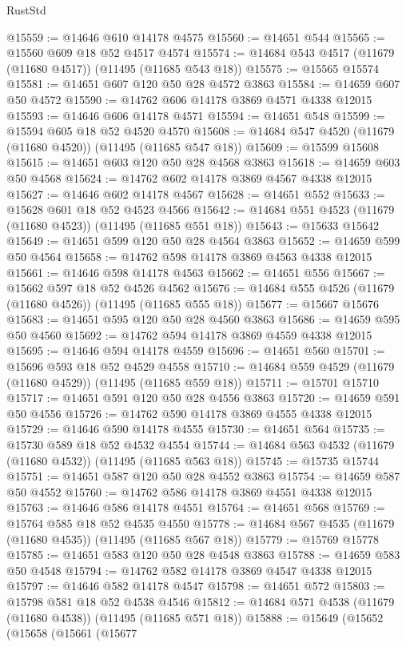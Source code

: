 \begin{lexlean}{RustStd}
\begin{coremodule}
@15559 := @14646 @610 @14178 @4575
@15560 := @14651 @544
@15565 := @15560 @609 @18 @52 @4517 @4574
@15574 := @14684 @543 @4517 (@11679 (@11680 @4517)) (@11495 (@11685 @543 @18))
@15575 := @15565 @15574
@15581 := @14651 @607 @120 @50 @28 @4572 @3863
@15584 := @14659 @607 @50 @4572
@15590 := @14762 @606 @14178 @3869 @4571 @4338 @12015
@15593 := @14646 @606 @14178 @4571
@15594 := @14651 @548
@15599 := @15594 @605 @18 @52 @4520 @4570
@15608 := @14684 @547 @4520 (@11679 (@11680 @4520)) (@11495 (@11685 @547 @18))
@15609 := @15599 @15608
@15615 := @14651 @603 @120 @50 @28 @4568 @3863
@15618 := @14659 @603 @50 @4568
@15624 := @14762 @602 @14178 @3869 @4567 @4338 @12015
@15627 := @14646 @602 @14178 @4567
@15628 := @14651 @552
@15633 := @15628 @601 @18 @52 @4523 @4566
@15642 := @14684 @551 @4523 (@11679 (@11680 @4523)) (@11495 (@11685 @551 @18))
@15643 := @15633 @15642
@15649 := @14651 @599 @120 @50 @28 @4564 @3863
@15652 := @14659 @599 @50 @4564
@15658 := @14762 @598 @14178 @3869 @4563 @4338 @12015
@15661 := @14646 @598 @14178 @4563
@15662 := @14651 @556
@15667 := @15662 @597 @18 @52 @4526 @4562
@15676 := @14684 @555 @4526 (@11679 (@11680 @4526)) (@11495 (@11685 @555 @18))
@15677 := @15667 @15676
@15683 := @14651 @595 @120 @50 @28 @4560 @3863
@15686 := @14659 @595 @50 @4560
@15692 := @14762 @594 @14178 @3869 @4559 @4338 @12015
@15695 := @14646 @594 @14178 @4559
@15696 := @14651 @560
@15701 := @15696 @593 @18 @52 @4529 @4558
@15710 := @14684 @559 @4529 (@11679 (@11680 @4529)) (@11495 (@11685 @559 @18))
@15711 := @15701 @15710
@15717 := @14651 @591 @120 @50 @28 @4556 @3863
@15720 := @14659 @591 @50 @4556
@15726 := @14762 @590 @14178 @3869 @4555 @4338 @12015
@15729 := @14646 @590 @14178 @4555
@15730 := @14651 @564
@15735 := @15730 @589 @18 @52 @4532 @4554
@15744 := @14684 @563 @4532 (@11679 (@11680 @4532)) (@11495 (@11685 @563 @18))
@15745 := @15735 @15744
@15751 := @14651 @587 @120 @50 @28 @4552 @3863
@15754 := @14659 @587 @50 @4552
@15760 := @14762 @586 @14178 @3869 @4551 @4338 @12015
@15763 := @14646 @586 @14178 @4551
@15764 := @14651 @568
@15769 := @15764 @585 @18 @52 @4535 @4550
@15778 := @14684 @567 @4535 (@11679 (@11680 @4535)) (@11495 (@11685 @567 @18))
@15779 := @15769 @15778
@15785 := @14651 @583 @120 @50 @28 @4548 @3863
@15788 := @14659 @583 @50 @4548
@15794 := @14762 @582 @14178 @3869 @4547 @4338 @12015
@15797 := @14646 @582 @14178 @4547
@15798 := @14651 @572
@15803 := @15798 @581 @18 @52 @4538 @4546
@15812 := @14684 @571 @4538 (@11679 (@11680 @4538)) (@11495 (@11685 @571 @18))
@15888 := @15649
    (@15652
      (@15658
        (@15661
          (@15677

\end{coremodule}
\end{lexlean}
